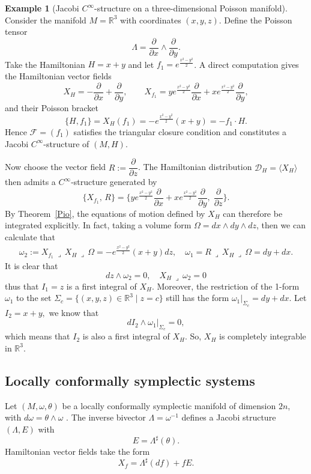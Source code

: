 \documentclass{article}
\theoremstyle{remark}
\theoremstyle{definition}
\newtheorem{example}{Example}[section]
\newcommand{\contract}{\,\lrcorner\,}
\begin{document}
\begin{example}[Jacobi $C^\infty$-structure on a three-dimensional Poisson manifold]
Consider the manifold \(M = \mathbb{R}^3\) with coordinates \((x, y, z)\).  
Define the Poisson tensor
\[
\Lambda = \frac{\partial}{\partial x} \wedge \frac{\partial}{\partial y}.
\]
Take the Hamiltonian \(H = x + y\) and let  
\(f_1 = e^{\frac{x^2 - y^2}{2}}\).  
A direct computation gives the Hamiltonian vector fields
\[
X_H = -\frac{\partial}{\partial x} +\frac{\partial}{\partial y}, 
\qquad
X_{f_1} =ye^{\frac{x^2-y^2}{2}}\frac{\partial}{\partial x} +xe^{\frac{x^2-y^2}{2}}\frac{\partial}{\partial y},
\]
and their Poisson bracket
\[
\{H, f_1\} = X_H(f_1) = -e^{\frac{x^2-y^2}{2}}(x+y) = -f_1\cdot H.
\]
Hence \(\mathcal{F} = (f_1)\) satisfies the triangular closure condition and constitutes a Jacobi \(C^\infty\)-structure of $(M,H)$.  

Now choose the vector field \(R := \dfrac{\partial}{\partial z}\).  
The Hamiltonian distribution \(\mathcal{D}_H = \langle X_H \rangle\) then admits a \(C^\infty\)-structure generated by
\[
\{X_{f_1},\, R\} = \Big\{ye^{\frac{x^2-y^2}{2}}\frac{\partial}{\partial x} +xe^{\frac{x^2-y^2}{2}}\frac{\partial}{\partial y},\; \frac{\partial}{\partial z}\Big\}.
\]
By Theorem~\ref{Pio}, the equations of motion defined by \(X_H\) can therefore be integrated explicitly. In fact, taking a volume form $\Omega=dx\wedge dy\wedge dz$, then we can calculate that
\begin{align*}
\omega_2:=X_{f_1}\contract X_H\contract\Omega=-e^{\frac{x^2-y^2}{2}}(x+y)dz,\quad \omega_1=R\contract X_H\contract\Omega=dy+dx.
\end{align*}
It is clear that 
$$dz\wedge\omega_2=0,\quad X_H\contract\omega_2=0$$
thus that $I_1=z$ is a first integral of $X_H.$ Moreover, the restriction of the 1-form $\omega_1$ to the set $\Sigma_c=\{(x,y,z)\in\mathbb R^3\;|\;z=c\}$ still has the form $\omega_1|_{\Sigma_c}=dy+dx$. Let $I_2=x+y,$ we know that 
$$dI_2\wedge\omega_1|_{\Sigma_c}=0, $$
which means that $I_2$ is also a first integral of $X_H.$ So, $X_H$ is completely integrable in $\mathbb R^3.$


\end{example}



\subsection{Locally conformally symplectic systems}

Let $(M,\omega,\theta)$ be a locally conformally symplectic manifold of dimension
$2n$, with $d\omega=\theta\wedge\omega$ \cite{Zhao5,Azuaje}. The inverse bivector $\Lambda=\omega^{-1}$
defines a Jacobi structure $(\Lambda,E)$ with
\[
E=\Lambda^\sharp(\theta).
\]
Hamiltonian vector fields take the form
\[
X_f=\Lambda^\sharp(df)+fE.
\]
\end{document}
